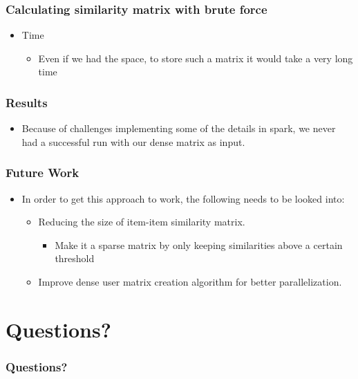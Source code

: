 \documentclass[11pt]{beamer}
\begin{document}
  \begin{frame}
    \frametitle{Calculating similarity matrix with brute force}
    \begin{itemize}
      \item Time
        \begin{itemize}
          \item Even if we had the space, to store such a matrix it would take a very long time
        \end{itemize}
    \end{itemize}
  \end{frame}

  \begin{frame}
    \frametitle{Results}
    \begin{itemize}
      \item Because of challenges implementing some of the details in spark, we never had a successful run
      with our dense matrix as input.
    \end{itemize}
  \end{frame}

  \begin{frame}
    \frametitle{Future Work}
    \begin{itemize}
      \item In order to get this approach to work, the following needs to be looked into:
      \begin{itemize}
        \item Reducing the size of item-item similarity matrix.
        \begin{itemize}
          \item Make it a sparse matrix by only keeping similarities above a certain threshold
        \end{itemize}
        \item Improve dense user matrix creation algorithm for better parallelization.
      \end{itemize}
    \end{itemize}
  \end{frame}

  \section{Questions?}
  \begin{frame}
    \frametitle{Questions?}
  \end{frame}

  
\end{document}
